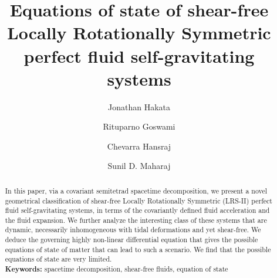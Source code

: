 \documentclass[abstract=on,notitlepage,superscriptaddress,nofootinbib,aps,preprint,prd]{revtex4}
\newcommand{\0}{^{(0)}}
\newcommand{\1}{^{(1)}}
\newcommand{\2}{^{(2)}}
\newcommand{\3}{{}^{(3)}}
\begin{document}

\title{Equations of state of shear-free Locally Rotationally Symmetric perfect fluid self-gravitating systems}



 \author{Jonathan Hakata}
\author{Rituparno Goswami}
 \author{Chevarra Hansraj}
\author{Sunil D. Maharaj}




\begin{abstract}
In this paper, via a covariant semitetrad spacetime decomposition, we present a novel geometrical classification of shear-free Locally Rotationally Symmetric (LRS-II) perfect fluid self-gravitating systems, in terms of the covariantly defined fluid acceleration and the fluid expansion. We further analyze the interesting class of these systems that are dynamic, necessarily inhomogeneous with tidal deformations and yet shear-free. We deduce the governing highly non-linear differential equation that gives the possible equations of state of matter that can lead to such a scenario. We find that the possible equations of state are very limited. \\ 
{\bf Keywords: } spacetime decomposition, shear-free fluids, equation of state
\end{abstract}
\end{document}

